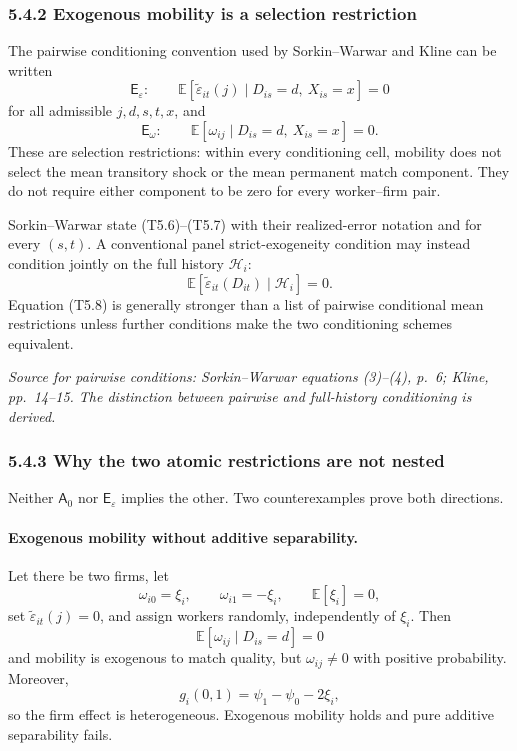 \documentclass[11pt]{article}
\begin{document}
\subsubsection{5.4.2 Exogenous mobility is a selection restriction}

The pairwise conditioning convention used by Sorkin--Warwar and Kline can be
written
\[
\mathsf E_\varepsilon:
\qquad
\mathbb E[
\widetilde\varepsilon_{it}(j)
\mid
D_{is}=d,\ X_{is}=x
]
=0
\tag{T5.6}
\]
for all admissible \(j,d,s,t,x\), and
\[
\mathsf E_\omega:
\qquad
\mathbb E[
\omega_{ij}
\mid
D_{is}=d,\ X_{is}=x
]
=0.
\tag{T5.7}
\]
These are selection restrictions: within every conditioning cell, mobility
does not select the mean transitory shock or the mean permanent match
component.  They do not require either component to be zero for every
worker--firm pair.

Sorkin--Warwar state (T5.6)--(T5.7) with their realized-error notation and
for every \((s,t)\).  A conventional panel strict-exogeneity condition may
instead condition jointly on the full history \(\mathcal H_i\):
\[
\mathbb E[
\widetilde\varepsilon_{it}(D_{it})
\mid
\mathcal H_i
]
=0.
\tag{T5.8}
\]
Equation (T5.8) is generally stronger than a list of pairwise conditional
mean restrictions unless further conditions make the two conditioning
schemes equivalent.

\textit{Source for pairwise conditions: Sorkin--Warwar equations (3)--(4),
p.\ 6; Kline, pp.\ 14--15.  The distinction between pairwise and full-history
conditioning is derived.}

\subsubsection{5.4.3 Why the two atomic restrictions are not nested}

Neither \(\mathsf A_0\) nor \(\mathsf E_\varepsilon\) implies the other.
Two counterexamples prove both directions.

\paragraph{Exogenous mobility without additive separability.}
Let there be two firms, let
\[
\omega_{i0}=\xi_i,
\qquad
\omega_{i1}=-\xi_i,
\qquad
\mathbb E[\xi_i]=0,
\tag{T5.9}
\]
set \(\widetilde\varepsilon_{it}(j)=0\), and assign workers randomly,
independently of \(\xi_i\).  Then
\[
\mathbb E[\omega_{ij}\mid D_{is}=d]=0
\tag{T5.10}
\]
and mobility is exogenous to match quality, but
\(\omega_{ij}\neq0\) with positive probability.  Moreover,
\[
g_i(0,1)=\psi_1-\psi_0-2\xi_i,
\tag{T5.11}
\]
so the firm effect is heterogeneous.  Exogenous mobility holds and pure
additive separability fails.
\end{document}
